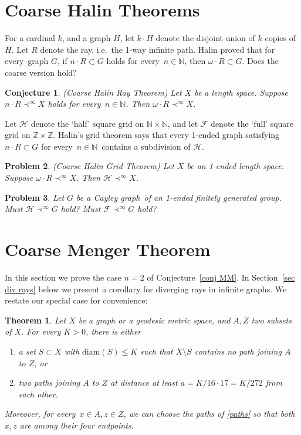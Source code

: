 \documentclass[a4paper]{article}
\newtheorem{theorem}[proposition]{Theorem}
\newtheorem{conjecture}{{Conjecture}}[section]
\newtheorem{problem}[conjecture]{{Problem}}
\newcommand{\N}{\ensuremath{\mathbb N}}
\newcommand{\Z}{\ensuremath{\mathbb Z}}
\newcommand{\nin}{\ensuremath{{n\in\N}}}
\newcommand{\Cg}{Cayley graph}
\newcommand{\Sr}[1]{Section~\ref{#1}}
\newcommand{\Cnr}[1]{Con\-jecture~\ref{#1}}
\newcommand{\fe}{for every}
\newcommand{\diam}{\mathrm{diam}}
\begin{document}
\section{Coarse Halin Theorems} \label{sec Halin}

For a cardinal $k$, and a graph $H$, let $k \cdot H$ denote the disjoint union of $k$ copies of $H$. Let $R$ denote the ray, i.e.\ the 1-way infinite path. Halin \cite{halin65} proved that \fe\ graph $G$, if $n\cdot R \subset G$ holds \fe\ $\nin$, then $\omega \cdot R \subset G$. Does the coarse version hold?

\begin{conjecture} \label{Cnr HRT}
(Coarse Halin Ray Theorem) Let $X$ be a length space. Suppose $n\cdot R \prec^\infty X$ holds \fe\ \nin. Then $\omega \cdot R \prec^\infty X$.
\end{conjecture}

Let $\mathcal{H}$ denote the `half' square grid on $\N \times \N$, and let $\mathcal{F}$  denote the `full' square grid on $\Z \times \Z$. Halin's grid theorem \cite{halin65} says that every 1-ended graph satisfying $n\cdot R \subset G$ \fe\ \nin\ contains a subdivision of $\mathcal{H}$.

\begin{problem}
(Coarse Halin Grid Theorem) Let $X$ be an 1-ended length space. Suppose $\omega \cdot R \prec^\infty X$. Then $\mathcal{H} \prec^\infty X$.
\end{problem}

\begin{problem}
Let $G$ be a \Cg\ of an 1-ended finitely generated group. Must $\mathcal{H} \prec^\infty G$ hold? Must $\mathcal{F} \prec^\infty G$ hold?
\end{problem}


\section{Coarse Menger Theorem} \label{sec Menger}

In this section we prove the case $n=2$ of \Cnr{conj MM}. In \Sr{sec div rays} below we present a corollary for diverging rays in infinite graphs. We restate our special case for convenience: 

\begin{theorem} \label{Menger}
Let $X$ be a graph or a geodesic metric space, and $A,Z$ two subsets of $X$. For every $K>0$, there is either
\begin{enumerate}
\item \label{S} a set $S \subset X$ with $\diam(S)\leq K$ such that $X \setminus S$ contains no path joining $A$ to $Z$, or 
\item \label{paths} two paths joining $A$ to $Z$ at distance at least $a=K/16\cdot 17=K/272$ from each other.
\end{enumerate}
Moreover, \fe\ $x\in A, z\in Z$, we can choose the paths of \ref{paths} so that both $x,z$ are among their four endpoints.

\end{theorem}
\end{document}
